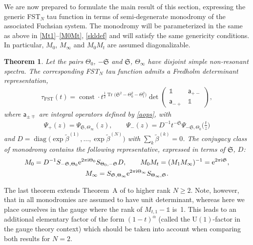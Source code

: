 \documentclass[pdftex]{sigma}
\numberwithin{equation}{section}
\newtheorem{Theorem}{Theorem}[section]
\begin{document}
We are now prepared to formulate the main result of this section, expressing the generic FST$_N$ tau function in terms of semi-degenerate monodromy of the associated Fuchsian system. The monodromy will be parameterized in the same as above in \eqref{Mt1}--\eqref{M0Mt}, \eqref{skldef} and will satisfy the same genericity conditions. In particular, $M_0$, $M_{\infty}$ and $M_0 M_t$ are assumed diagonalizable.
\begin{Theorem} \label{theofstfr}Let the pairs $\Theta_0$, $-\mathfrak S$ and $\mathfrak S$, $\Theta_\infty$ have disjoint simple non-resonant spectra. The corresponding FST$_N$ tau function admits a Fredholm determinant representation,
\begin{gather}\label{taufstfr}
\tau_{\mathrm{FST}}(t)=\operatorname{const}\cdot t^{\frac12\operatorname{Tr}\big(\mathfrak S^2-\Theta_0^2-\Theta_t^2\big)}
\det \left(\begin{matrix}
\mathds 1 & \mathsf a_{+-}\\
\mathsf a_{-+}
& \mathds 1
\end{matrix}\right),
\end{gather}
where $\mathsf a_{\pm\mp}$ are integral operators defined by \eqref{aops}, with
\begin{gather}\label{psipmfst}
\Psi_+(z)=\Psi_{\mathfrak S,\Theta_\infty}(z),\qquad \Psi_-(z)=D^{-1} t^{-\mathfrak S}\Psi_{-\mathfrak S,\Theta_0}\big(\tfrac tz\big)
\end{gather}
and $D=\operatorname{diag}\big(\exp\tilde\beta^{(1)},\ldots,\exp\tilde\beta^{(N)}\big)$ with $\sum_k\tilde\beta^{(k)}=0$. The conjugacy class of monodromy contains the following representative, expressed in terms of $\mathfrak S$, $D$:
\begin{gather*}
 M_0=D^{-1}S_{-\mathfrak S,\Theta_0}{\rm e}^{2\pi{\rm i} \Theta_0}S_{\Theta_0,-\mathfrak S}D,\qquad M_0M_t=( M_1 M_\infty)^{-1}={\rm e}^{2\pi{\rm i} \mathfrak S},\\
 M_{\infty}=S_{\mathfrak S,\Theta_\infty}{\rm e}^{2\pi{\rm i} \Theta_\infty}S_{\Theta_\infty,\mathfrak S}.
\end{gather*}
\end{Theorem}
\begin{Remark}
The last theorem extends Theorem~A of \cite{GL16} to higher rank $N\ge2$. Note, however, that in \cite{GL16} all monodromies are assumed to have unit determinant, whereas here we place ourselves in the gauge where the rank of $M_{t,1}-\mathds 1$ is~1. This leads to an additional elementary factor of the form $(1-t)^{\alpha}$ (called the $\mathrm{U}(1)$-factor in the gauge theory context) which should be taken into account when comparing both results for $N=2$.
\end{Remark}
\end{document}
